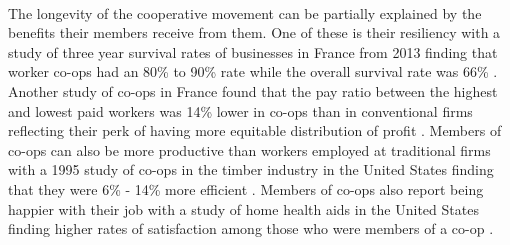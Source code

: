 \paragraph{} The longevity of the cooperative movement can be partially explained by the benefits their members receive from them. One of these is their resiliency with a study of three year survival rates of businesses in France from 2013 finding that worker co-ops had an 80\% to 90\% rate while the overall survival rate was 66\% \autocite{kruse_relative_2013}. Another study of co-ops in France found that the pay ratio between the highest and lowest paid workers was 14\% lower in co-ops than in conventional firms reflecting their perk of having more equitable distribution of profit \autocite{magne_wage_2017}. Members of co-ops can also be more productive than workers employed at traditional firms with a 1995 study of co-ops in the timber industry in the United States finding that they were 6\% - 14\% more efficient \autocite{craig_participation_1995}. Members of co-ops also report being happier with their job with a study of home health aids in the United States finding higher rates of satisfaction among those who were members of a co-op \autocite{kruse_effects_2013}.



